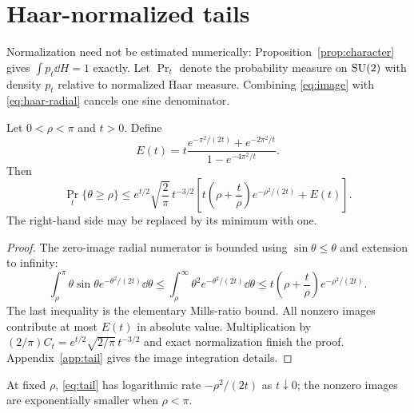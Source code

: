 \section{Haar-normalized tails}\label{sec:tails}

Normalization need not be estimated numerically: Proposition~\ref{prop:character}
gives $\int p_t\dd H=1$ exactly.  Let $\Pr_t$ denote the probability measure
on $\mathrm{SU}(2)$ with density $p_t$ relative to normalized Haar measure.  Combining
\eqref{eq:image} with \eqref{eq:haar-radial} cancels one sine denominator.

\begin{theorem}\label{thm:tail}
Let $0<\rho<\pi$ and $t>0$.  Define
\begin{equation}\label{eq:E}
E(t)=t\frac{e^{-\pi^2/(2t)}+e^{-2\pi^2/t}}
{1-e^{-4\pi^2/t}}.
\end{equation}
Then
\begin{equation}\label{eq:tail}
\Pr_t\{\theta\ge\rho\}
\le e^{t/2}\sqrt{\frac2\pi}\,t^{-3/2}
\left[t\left(\rho+\frac{t}{\rho}\right)e^{-\rho^2/(2t)}+E(t)\right].
\end{equation}
The right-hand side may be replaced by its minimum with one.
\end{theorem}

\begin{proof}
The zero-image radial numerator is bounded using $\sin\theta\le\theta$ and
extension to infinity:
\[
 \int_\rho^\pi\theta\sin\theta e^{-\theta^2/(2t)}\dd\theta
 \le\int_\rho^\infty\theta^2e^{-\theta^2/(2t)}\dd\theta
 \le t\left(\rho+\frac t\rho\right)e^{-\rho^2/(2t)}.
\]
The last inequality is the elementary Mills-ratio bound.  All nonzero images
contribute at most $E(t)$ in absolute value.  Multiplication by
$(2/\pi)C_t=e^{t/2}\sqrt{2/\pi}\,t^{-3/2}$ and exact normalization finish the
proof.  Appendix~\ref{app:tail} gives the image integration details.
\end{proof}

At fixed $\rho$, \eqref{eq:tail} has logarithmic rate
$-\rho^2/(2t)$ as $t\downarrow0$; the nonzero images are exponentially
smaller when $\rho<\pi$.
